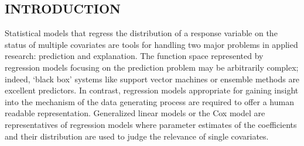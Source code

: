 
\begin{center}
\section{INTRODUCTION}
\end{center}

Statistical models that regress the distribution of a response variable
on the status of multiple covariates are tools for handling two major
problems in applied research:
prediction and explanation. The function space represented by
regression models
focusing on the prediction problem may be arbitrarily complex; indeed, 
`black
box' systems like support vector machines or ensemble methods are excellent
predictors. In contrast, regression models appropriate for gaining insight
into the
mechanism of the data generating process are required to offer
a human readable representation. Generalized linear models or
the Cox model are representatives of regression models where 
parameter estimates of the coefficients and their distribution
are used to judge the relevance of single covariates.

